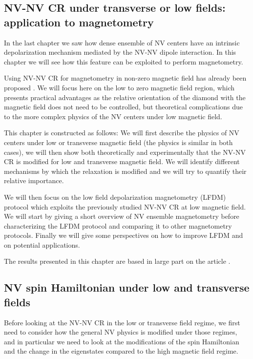 \documentclass[a4paper,11pt]{report}
\begin{document}
 \begin{refsection}

\chapter{NV-NV CR under transverse or low fields: application to magnetometry}

In the last chapter we saw how dense ensemble of NV centers have an intrinsic depolarization mechanism mediated by the NV-NV dipole interaction. In this chapter we will see how this feature can be exploited to perform magnetometry. 

Using NV-NV CR for magnetometry in non-zero magnetic field has already been proposed \citep{akhmedzhanov2017microwave, akhmedzhanov2019magnetometry}. We will focus here on the low to zero magnetic field region, which presents practical advantages as the relative orientation of the diamond with the magnetic field does not need to be controlled, but theoretical complications due to the more complex physics of the NV centers under low magnetic field.

This chapter is constructed as follows: We will first describe the physics of NV centers under low or transverse magnetic field (the physics is similar in both cases), we will then show both theoretically and experimentally that the NV-NV CR is modified for low and transverse magnetic field. We will identify different mechanisms by which the relaxation is modified and we will try to quantify their relative importance.

We will then focus on the low field depolarization magnetometry (LFDM) protocol which exploits the previously studied NV-NV CR at low magnetic field. We will start by giving a short overview of NV ensemble magnetometry before characterizing the LFDM protocol and comparing it to other magnetometry protocols. Finally we will give some perspectives on how to improve LFDM and on potential applications.

The results presented in this chapter are based in large part on the article \citep{pellet2022spin}.

\section{NV spin Hamiltonian under low and transverse fields}

Before looking at the NV-NV CR in the low or transverse field regime, we first need to consider how the general NV physics is modified under those regimes, and in particular we need to look at the modifications of the spin Hamiltonian and the change in the eigenstates compared to the high magnetic field regime.


\end{refsection}
\end{document}
